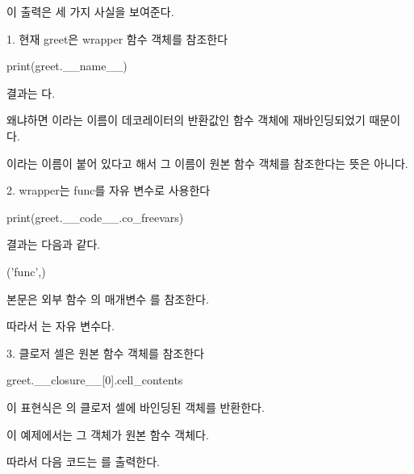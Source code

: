 이 출력은 세 가지 사실을 보여준다.

\begin{dhknote}
\begin{dhksmry}[centered]
1. 현재 greet은 wrapper 함수 객체를 참조한다
\end{dhksmry}
\end{dhknote}

\begin{dhkcode}
print(greet.__name__)
\end{dhkcode}

결과는 다.

왜냐하면 이라는 이름이 데코레이터의 반환값인  함수 객체에 재바인딩되었기 때문이다.

이라는 이름이 붙어 있다고 해서 그 이름이 원본 함수 객체를 참조한다는 뜻은 아니다.

\begin{dhknote}
\begin{dhksmry}[centered]
2. wrapper는 func를 자유 변수로 사용한다
\end{dhksmry}
\end{dhknote}

\begin{dhkcode}
print(greet.__code__.co_freevars)
\end{dhkcode}

결과는 다음과 같다.

\begin{dhkzsh}
('func',)
\end{dhkzsh}

 본문은 외부 함수 의 매개변수 를 참조한다.

따라서 는 자유 변수다.

\begin{dhknote}
\begin{dhksmry}[centered]
3. 클로저 셀은 원본 함수 객체를 참조한다
\end{dhksmry}
\end{dhknote}

\begin{dhkcode}
greet.__closure__[0].cell_contents
\end{dhkcode}

이 표현식은 의 클로저 셀에 바인딩된 객체를 반환한다.

이 예제에서는 그 객체가 원본  함수 객체다.

따라서 다음 코드는 를 출력한다.

